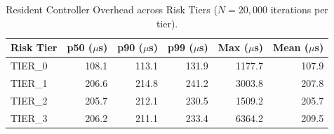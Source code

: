 \begin{table}[t]
\centering
\small
\caption{Resident Controller Overhead across Risk Tiers ($N=20,000$ iterations per tier).}
\label{tab:overhead}
\begin{tabular}{lrrrrr}
\toprule
\textbf{Risk Tier} & \textbf{p50 ($\mu$s)} & \textbf{p90 ($\mu$s)} & \textbf{p99 ($\mu$s)} & \textbf{Max ($\mu$s)} & \textbf{Mean ($\mu$s)} \\
\midrule
TIER_0 & 108.1 & 113.1 & 131.9 & 1177.7 & 107.9 \\
TIER_1 & 206.6 & 214.8 & 241.2 & 3003.8 & 207.8 \\
TIER_2 & 205.7 & 212.1 & 230.5 & 1509.2 & 205.7 \\
TIER_3 & 206.2 & 211.1 & 233.4 & 6364.2 & 209.5 \\
\bottomrule
\end{tabular}
\end{table}
